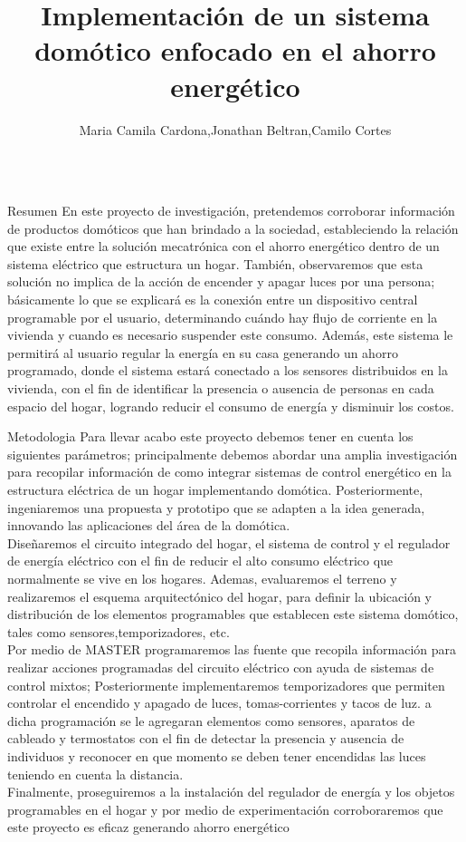 \documentclass{beamer}
\author[mccardona@academia.usbbog.edu.co,jobeltran@academia.usbbog.edu.ccortes@academia.usbbog.edu.co]{Maria Camila Cardona,Jonathan Beltran,Camilo Cortes}
\title{Implementación de un sistema domótico enfocado en el ahorro energético}
\institute{Universidad de San Buenaventura}
\begin{document}
\begin{frame}[fragile]\centering

\begin{columns}[T]

\begin{column}{.48\linewidth}
\hspace{9em}
\begin{block}{Resumen}
En este proyecto de investigación, pretendemos corroborar información de productos domóticos que han brindado a la sociedad, estableciendo la relación que existe entre la solución mecatrónica con el ahorro energético dentro de un sistema eléctrico que estructura un hogar.
 También, observaremos que esta solución no implica de la acción de encender y apagar luces por una persona; básicamente lo que se explicará es la conexión entre un dispositivo central programable por el usuario, determinando cuándo hay flujo de corriente en la vivienda y cuando es necesario suspender este consumo. Además, este sistema le permitirá al usuario regular la energía en su casa generando un ahorro programado, donde el sistema estará conectado a los sensores distribuidos en la vivienda, con el fin de  identificar la presencia o ausencia de personas en cada espacio del hogar, logrando reducir el consumo de energía y disminuir los costos.
\end{block}

\begin{block}{Metodologia}
Para llevar acabo este proyecto debemos tener en cuenta los siguientes parámetros; principalmente debemos abordar una amplia investigación para recopilar información de como integrar sistemas de control energético en la estructura eléctrica de un hogar implementando domótica. Posteriormente, ingeniaremos una propuesta  y prototipo que se adapten a la idea generada, innovando las aplicaciones del área de la domótica.
\\ Diseñaremos el circuito integrado del hogar, el sistema de control y el regulador de energía eléctrico con el fin de reducir el alto consumo  eléctrico que normalmente se vive en los hogares. Ademas, evaluaremos el terreno y realizaremos el esquema arquitectónico  del hogar, para definir la ubicación y distribución de los elementos programables que establecen este sistema domótico, tales como sensores,temporizadores, etc.
\\Por medio de MASTER programaremos las fuente que recopila información para realizar acciones programadas del circuito eléctrico con ayuda de sistemas de control mixtos; Posteriormente implementaremos temporizadores que permiten controlar el encendido y apagado de luces, tomas-corrientes y tacos de luz. a dicha programación se le agregaran elementos como sensores, aparatos de cableado y termostatos con el fin de detectar la presencia y ausencia de individuos y reconocer en que momento se deben tener encendidas las luces teniendo en cuenta la distancia. 
\\Finalmente, proseguiremos a la instalación del regulador de energía y los objetos programables en el hogar y por medio de experimentación corroboraremos que este proyecto es eficaz generando ahorro energético
\end{block}



\end{column}
\end{columns}
\end{frame}
\end{document}
